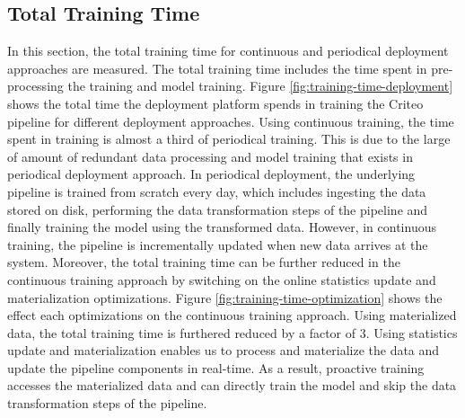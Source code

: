 \subsection{Total Training Time}
In this section, the total training time for continuous and periodical deployment approaches are measured.
The total training time includes the time spent in pre-processing the training and model training.
Figure \ref{fig:training-time-deployment} shows the total time the deployment platform spends in training the Criteo pipeline for different deployment approaches.
Using continuous training, the time spent in training is almost a third of periodical training.
This is due to the large of amount of redundant data processing and model training that exists in periodical deployment approach.
In periodical deployment, the underlying pipeline is trained from scratch every day, which includes ingesting the data stored on disk, performing the data transformation steps of the pipeline and finally training the model using the transformed data.
However, in continuous training, the pipeline is incrementally updated when new data arrives at the system.
Moreover, the total training time can be further reduced in the continuous training approach by switching on the online statistics update and materialization optimizations.
Figure \ref{fig:training-time-optimization} shows the effect each optimizations on the continuous training approach.
Using materialized data, the total training time is furthered reduced by a factor of 3.
Using statistics update and materialization enables us to process and materialize the data and update the pipeline components in real-time.
As a result, proactive training accesses the materialized data and can directly train the model and skip the data transformation steps of the pipeline.

